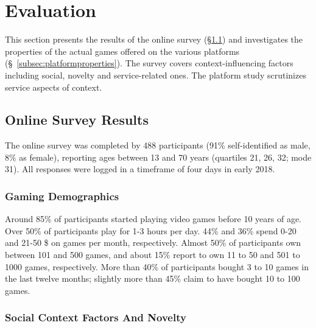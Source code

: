 \section{Evaluation}
\label{sec:eval}

This section presents the results of the online survey
(§\ref{subsec:survey}) and
investigates the properties of the actual games offered on the
various platforms (§~\ref{subsec:platformproperties}).
The survey covers context-influencing factors including social,
novelty and service-related ones. The platform study scrutinizes
service aspects of context.

\subsection{Online Survey Results}\label{subsec:survey}
The online survey was completed by 488 participants
(91\% self-identified as male, 8\% as female), reporting
ages between 13 and 70 years (quartiles 21, 26, 32; mode 31).
All responses were logged in a timeframe of four days in early 2018.

\subsubsection{Gaming Demographics}
Around 85\% of
participants started playing video games before 10 years of age.
Over 50\% of participants play for 1-3 hours per day.
44\% and 36\% spend 0-20 and 21-50 \$ on games per month, respectively.
Almost 50\% of participants own between 101 and 500 games, and about
15\% report to own 11 to 50 and 501 to 1000 games, respectively.
More than 40\% of participants bought 3 to 10 games in the last
twelve months; slightly more than 45\% claim to have bought
10 to 100 games.



\subsubsection{Social Context Factors And Novelty}


